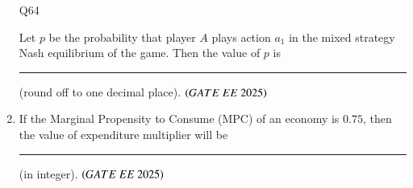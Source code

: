 \documentclass[journal,12pt,onecolumn]{IEEEtran}
\theoremstyle{remark}
\begin{document}
\begin{enumerate}
\begin{table}[H]
\centering

\caption{Q64}
\label{Q64}
\end{table}

Let $p$ be the probability that player $A$ plays action $a_1$ in the mixed strategy Nash equilibrium of the game.  
Then the value of $p$ is \rule{2cm}{0.4pt} (round off to one decimal place).  
\hfill $\brak{GATE\ EE\ 2025}$

\item If the Marginal Propensity to Consume (MPC) of an economy is $0.75$, then the value of expenditure multiplier will be \rule{2cm}{0.4pt} (in integer).  
\hfill $\brak{GATE\ EE\ 2025}$
  \end{enumerate}
  
\end{document}
